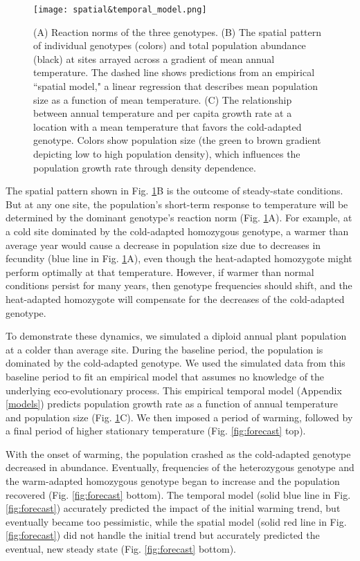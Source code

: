 \documentclass[11pt]{article}
\begin{document}
\begin{figure}[tbp]
\centering
\texttt{[image: spatial\&temporal\_model.png]}
\caption{(A) Reaction norms of the three genotypes. (B) The spatial pattern of individual genotypes (colors) and total population abundance (black) at sites arrayed across a gradient of mean annual temperature. The dashed line shows predictions from an empirical ``spatial model," a linear regression that describes mean population size as a function of mean temperature. (C) The relationship between annual temperature and per capita growth rate at a location with a mean temperature that favors the cold-adapted genotype. Colors show population size (the green to brown gradient depicting low to high population density), which influences the population growth rate through density dependence. }
\label{fig:evo_evo_spatial_temporal_models}
\end{figure}

The spatial pattern shown in Fig. \ref{fig:evo_evo_spatial_temporal_models}B is the outcome of steady-state conditions. But at any one site, the population's short-term response to temperature will be determined by the dominant genotype's reaction norm (Fig. \ref{fig:evo_evo_spatial_temporal_models}A). For example, at a cold site dominated by the cold-adapted homozygous genotype, a warmer than average year would cause a decrease in population size due to decreases in fecundity (blue line in Fig. \ref{fig:evo_evo_spatial_temporal_models}A), even though the heat-adapted homozygote might perform optimally at that temperature. However, if warmer than normal conditions persist for many years, then genotype frequencies should shift, and the heat-adapted homozygote will compensate for the decreases of the cold-adapted genotype. 

To demonstrate these dynamics, we simulated a diploid annual plant population at a colder than average site. During the baseline period, the population is dominated by the cold-adapted genotype. We used the simulated data from this baseline period to fit an empirical model that assumes no knowledge of the underlying eco-evolutionary process. This empirical temporal model (Appendix \ref{models}) predicts population growth rate as a function of annual temperature and population size (Fig. \ref{fig:evo_evo_spatial_temporal_models}C). We then imposed a period of warming, followed by a final period of higher stationary temperature (Fig. \ref{fig:forecast} top).

With the onset of warming, the population crashed as the cold-adapted genotype decreased in abundance. Eventually, frequencies of the heterozygous genotype and the warm-adapted homozygous genotype began to increase and the population recovered (Fig. \ref{fig:forecast} bottom). The temporal model (solid blue line in Fig. \ref{fig:forecast}) accurately predicted the impact of the initial warming trend, but eventually became too pessimistic, while the spatial model (solid red line in Fig. \ref{fig:forecast}) did not handle the initial trend but accurately predicted the eventual, new steady state (Fig. \ref{fig:forecast} bottom).
\end{document}
